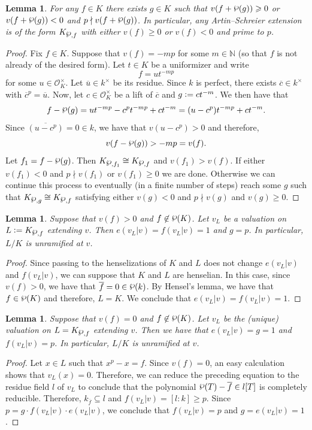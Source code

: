\documentclass[a4paper,english,12pt]{amsart}
\newtheorem{lemma}[definition]{Lemma}
\numberwithin{equation}{section}
\newcommand{\defeq}{\vcentcolon=}
\renewcommand{\geq}{\geqslant}
\renewcommand{\wp}{\ensuremath\raisebox{\depth}{$\mathchar"17D$}}
\renewcommand{\_}{\rule{0.25cm}{0.4pt}}
\begin{document}
\begin{lemma}
For any $f \in K$ there exists $g \in K$ such that $v(f+\wp(g)) \geq 0$ or  $v(f+\wp(g))<0$ and $p\nmid v(f+\wp(g))$. In particular, any Artin--Schreier extension is of the form $K_{\wp, f}$ with either $v(f)\geq 0$ or $v(f)<0$ and prime to $p$.
\end{lemma}
\begin{proof}
Fix $f\in K$. Suppose that $v(f)=-mp$ for some $m\in \mathbb{N}$ (so that $f$ is not already of the desired form). Let $t\in K$ be a uniformizer and write
\[
  f=ut^{-mp}
\]
for some $u \in \mathcal{O}_{K}^\times$. Let $\overline{u} \in k^\times$ be its residue. Since $k$ is perfect, there exists $\overline{c} \in k^\times$ with $\overline{c}^p = \overline{u}$. Now, let $c \in \mathcal{O}_{K}^\times$ be a lift of $\overline{c}$ and $g\defeq ct^{-m}$. We then have that
\[
  f-\wp(g)=ut^{-mp}-c^{p}t^{-mp}+ct^{-m}=(u-c^{p})t^{-mp}+ct^{-m}.
\]
Since $\overline{(u-c^{p})}=0\in k$, we have that $v(u-c^{p})>0$ and therefore,
\[
  v(f-\wp(g))>-mp=v(f).
\]
Let $f_{1}=f-\wp(g)$. Then $K_{\wp, f_{1}}\cong K_{\wp, f}$ and $v(f_1) > v(f)$. If either $v(f_{1})<0$ and $p\nmid v(f_{1})$ or $v(f_{1})\geq 0$ we are done. Otherwise we can continue this process to eventually (in a finite number of steps) reach some $g$ such that $K_{\wp, g}\cong K_{\wp, f}$ satisfying either $v(g)<0$ and $p\nmid v(g)$ and $v(g)\geq 0$.
\end{proof}

\begin{lemma}\label{AS split}
Suppose that $v(f)>0$ and $f\not\in\wp(K)$. Let $v_{L}$ be a valuation on $L\defeq K_{\wp, f}$ extending $v$. Then $e(v_{L}|v)=f(v_{L}|v)=1$ and $g=p$. In particular, $L/K$ is unramified at $v$.
\end{lemma}
\begin{proof}
Since passing to the henselizations of $K$ and $L$ does not change $e(v_{L}|v)$ and $f(v_{L}|v)$, we can suppose that $K$ and $L$ are henselian. In this case, since $v(f)>0$, we have that $\overline{f}=0\in \wp(k)$. By Hensel's lemma, we have that $f\in \wp(K)$ and therefore, $L=K$. We conclude that $e(v_{L}|v)=f(v_{L}|v)=1$.
\end{proof}

\begin{lemma}\label{AS unramified}
Suppose that $v(f)=0$ and $f\not\in\wp(K)$. Let $v_{L}$ be the (unique) valuation on $L=K_{\wp, f}$ extending $v$. Then we have that $e(v_{L}|v)=g=1$ and $f(v_{L}|v)=p$. In particular, $L/K$ is unramified at $v$.
\end{lemma}
\begin{proof}
Let $x\in L$ such that $x^p-x=f$. Since $v(f)=0$, an easy calculation shows that $v_{L}(x)=0$. Therefore, we can reduce the preceding equation to the residue field $l$ of $v_{L}$ to conclude that the polynomial $\wp(T)-\overline{f}\in l[T]$ is completely reducible. Therefore, $k_{\overline{f}}\subseteq l$ and $f(v_{L}|v)=[l\colon k]\geq p$. Since $p=g\cdot f(v_{L}|v)\cdot e(v_{L}|v)$, we conclude that $f(v_{L}|v)=p$ and $g=e(v_{L}|v)=1$.
\end{proof}
\end{document}
